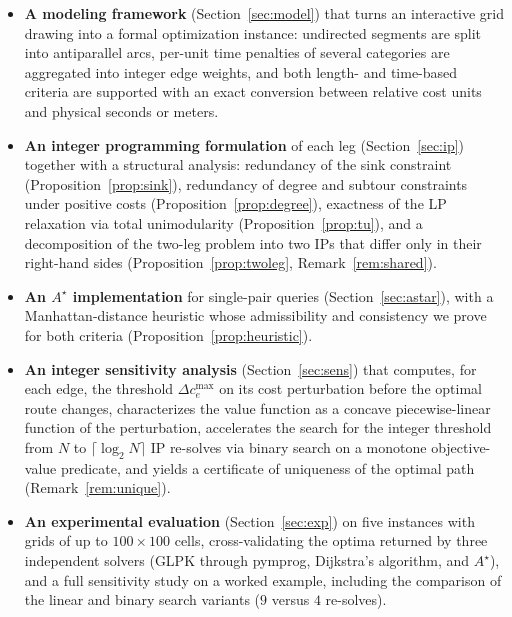 \documentclass[10pt,twocolumn]{article}
\begin{document}
\begin{itemize}
  \item \textbf{A modeling framework} (Section~\ref{sec:model}) that turns an interactive
        grid drawing into a formal optimization instance: undirected segments are split into
        antiparallel arcs, per-unit time penalties of several categories are aggregated into
        integer edge weights, and both length- and time-based criteria are supported with an
        exact conversion between relative cost units and physical seconds or meters.
  \item \textbf{An integer programming formulation} of each leg (Section~\ref{sec:ip})
        together with a structural analysis: redundancy of the sink constraint
        (Proposition~\ref{prop:sink}), redundancy of degree and subtour constraints under
        positive costs (Proposition~\ref{prop:degree}), exactness of the LP relaxation via
        total unimodularity (Proposition~\ref{prop:tu}), and a decomposition of the two-leg
        problem into two IPs that differ only in their right-hand sides
        (Proposition~\ref{prop:twoleg}, Remark~\ref{rem:shared}).
  \item \textbf{An $A^{\star}$ implementation} for single-pair queries
        (Section~\ref{sec:astar}), with a Manhattan-distance heuristic whose admissibility
        and consistency we prove for both criteria (Proposition~\ref{prop:heuristic}).
  \item \textbf{An integer sensitivity analysis} (Section~\ref{sec:sens}) that computes, for
        each edge, the threshold $\Delta c^{\max}_e$ on its cost perturbation before the
        optimal route changes, characterizes the value function as a concave piecewise-linear
        function of the perturbation, accelerates the search for the integer threshold from
        $N$ to $\lceil \log_2 N\rceil$ IP re-solves via binary search on a monotone
        objective-value predicate, and yields a certificate of uniqueness of the optimal path
        (Remark~\ref{rem:unique}).
  \item \textbf{An experimental evaluation} (Section~\ref{sec:exp}) on five instances with
        grids of up to $100\times100$ cells, cross-validating the optima returned by three
        independent solvers (GLPK through \textsf{pymprog}, Dijkstra's algorithm, and $A^{\star}$),
        and a full sensitivity study on a worked example, including the comparison of the
        linear and binary search variants ($9$ versus $4$ re-solves).
\end{itemize}
\end{document}
